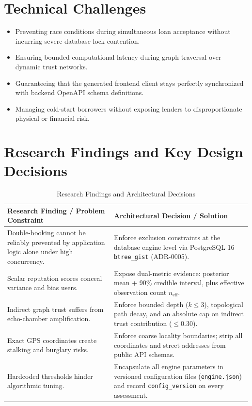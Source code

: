 \section{Technical Challenges}
\begin{itemize}
    \item Preventing race conditions during simultaneous loan acceptance without incurring severe database lock contention.
    \item Ensuring bounded computational latency during graph traversal over dynamic trust networks.
    \item Guaranteeing that the generated frontend client stays perfectly synchronized with backend OpenAPI schema definitions.
    \item Managing cold-start borrowers without exposing lenders to disproportionate physical or financial risk.
\end{itemize}

\section{Research Findings and Key Design Decisions}
\begin{table}[htbp]
\centering
\caption{Research Findings and Architectural Decisions}
\label{tab:research_findings}
\small
\begin{tabularx}{\textwidth}{p{6.5cm} p{8cm}}
\toprule
\textbf{Research Finding / Problem Constraint} & \textbf{Architectural Decision / Solution} \\
\midrule
Double-booking cannot be reliably prevented by application logic alone under high concurrency. & Enforce exclusion constraints at the database engine level via PostgreSQL 16 \texttt{btree\_gist} (ADR-0005). \\
Scalar reputation scores conceal variance and bias users. & Expose dual-metric evidence: posterior mean + 90\% credible interval, plus effective observation count $n_{\text{eff}}$. \\
Indirect graph trust suffers from echo-chamber amplification. & Enforce bounded depth ($k \le 3$), topological path decay, and an absolute cap on indirect trust contribution ($\le 0.30$). \\
Exact GPS coordinates create stalking and burglary risks. & Enforce coarse locality boundaries; strip all coordinates and street addresses from public API schemas. \\
Hardcoded thresholds hinder algorithmic tuning. & Encapsulate all engine parameters in versioned configuration files (\texttt{engine.json}) and record \texttt{config\_version} on every assessment. \\
\bottomrule
\end{tabularx}
\end{table}
